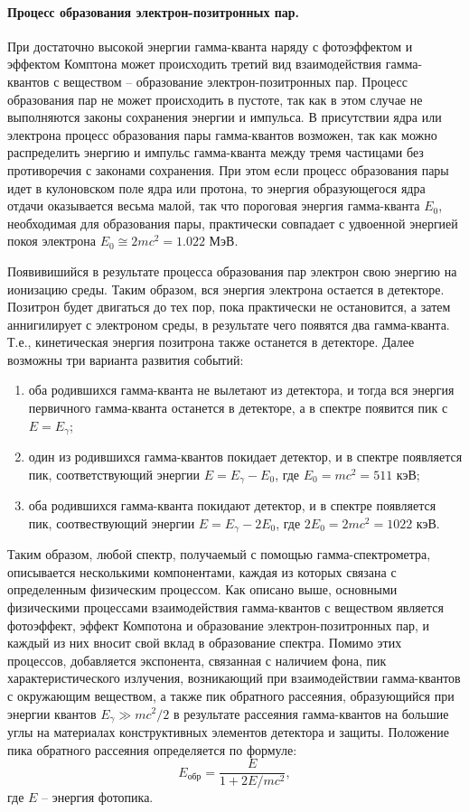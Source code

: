 \documentclass[a4paper, 12pt]{article}
\begin{document}
\paragraph{Процесс образования электрон-позитронных пар.}
При достаточно высокой энергии гамма-кванта наряду с фотоэффектом и эффектом Комптона может происходить третий вид взаимодействия гамма-квантов с веществом -- образование электрон-позитронных пар. Процесс образования пар не может происходить в пустоте, так как в этом случае не выполняются законы сохранения энергии и импульса. В присутствии ядра или электрона процесс образования пары гамма-квантов возможен, так как можно распределить энергию и импульс гамма-кванта между тремя частицами без противоречия с законами сохранения. При этом если процесс образования пары идет в кулоновском поле ядра или протона, то энергия образующегося ядра отдачи оказывается весьма малой, так что пороговая энергия гамма-кванта $E_0$, необходимая для образования пары, практически совпадает с удвоенной энергией покоя электрона $E_0\cong 2mc^2=1.022$ МэВ.\par
Появивишийся в результате процесса образования пар электрон свою энергию на ионизацию среды. Таким образом, вся энергия электрона остается в детекторе. Позитрон будет двигаться до тех пор, пока практически не остановится, а затем аннигилирует с электроном среды, в результате чего появятся два гамма-кванта. Т.е., кинетическая энергия позитрона также останется в детекторе. Далее возможны три варианта развития событий:
\begin{enumerate}
\item оба родившихся гамма-кванта не вылетают из детектора, и тогда вся энергия первичного гамма-кванта останется в детекторе, а в спектре появится пик с $E=E_{\gamma}$;
\item один из родившихся гамма-квантов покидает детектор, и в спектре появляется пик, соответствующий энергии $E=E_{\gamma}-E_0$, где $E_0=mc^2=511$ кэВ;
\item оба родившихся гамма-кванта покидают детектор, и в спектре появляется пик, соотвествующий энергии $E=E_{\gamma}-2E_0$, где $2E_0=2mc^2=1022$ кэВ.
\end{enumerate}
Таким образом, любой спектр, получаемый с помощью гамма-спектрометра, описывается несколькими компонентами, каждая из которых связана с определенным физическим процессом. Как описано выше, основными физическими процессами взаимодействия гамма-квантов с веществом является фотоэффект, эффект Компотона и образование электрон-позитронных пар, и каждый из них вносит свой вклад в образование спектра. Помимо этих процессов, добавляется экспонента, связанная с наличием фона, пик характеристического излучения, возникающий при взаимодействии гамма-квантов с окружающим веществом, а также пик обратного рассеяния, образующийся при энергии квантов $E_{\gamma}\gg mc^2/2$ в результате рассеяния гамма-квантов на большие углы на материалах  конструктивных элементов детектора и защиты. Положение пика обратного рассеяния определяется по формуле:
\begin{equation}
E_{\text{обр}}=\frac{E}{1+2E/mc^2},
\label{eq:Ereverse}
\end{equation}
где $E$ -- энергия фотопика.\par
\end{document}
